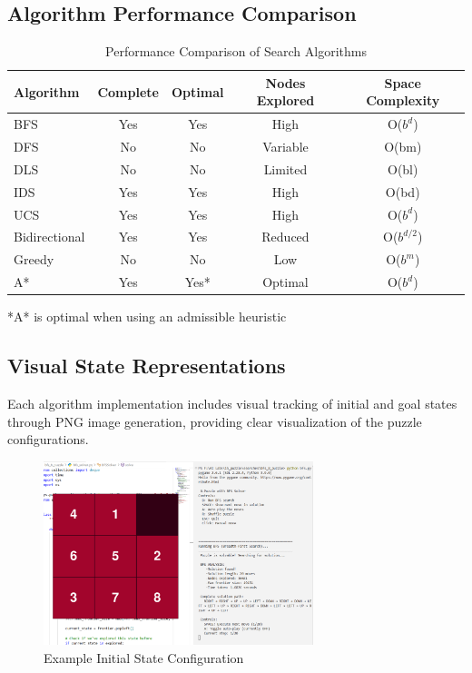 \documentclass[11pt,a4paper]{article}
\begin{document}
\subsection{Algorithm Performance Comparison}

\begin{table}[H]
\centering
\caption{Performance Comparison of Search Algorithms}
\begin{tabular}{|l|c|c|c|c|}
\hline
\textbf{Algorithm} & \textbf{Complete} & \textbf{Optimal} & \textbf{Nodes Explored} & \textbf{Space Complexity} \\
\hline
BFS & Yes & Yes & High & O($b^d$) \\
\hline
DFS & No & No & Variable & O(bm) \\
\hline
DLS & No & No & Limited & O(bl) \\
\hline
IDS & Yes & Yes & High & O(bd) \\
\hline
UCS & Yes & Yes & High & O($b^d$) \\
\hline
Bidirectional & Yes & Yes & Reduced & O($b^{d/2}$) \\
\hline
Greedy & No & No & Low & O($b^m$) \\
\hline
A* & Yes & Yes* & Optimal & O($b^d$) \\
\hline
\end{tabular}
\end{table}

*A* is optimal when using an admissible heuristic

\subsection{Visual State Representations}

Each algorithm implementation includes visual tracking of initial and goal states through PNG image generation, providing clear visualization of the puzzle configurations.

\begin{figure}[H]
\centering
\includegraphics[width=0.7\textwidth]{../searches/bfs_8_puzzle/Start_state.png}
\caption{Example Initial State Configuration}
\end{figure}
\end{document}
